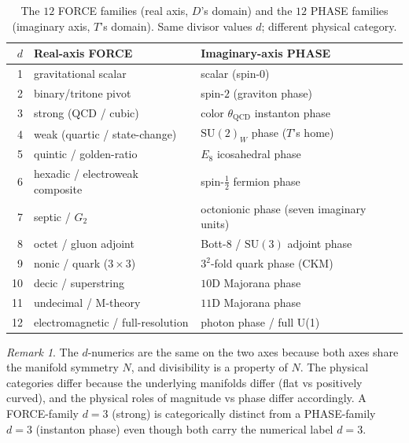 \documentclass[11pt,a4paper]{article}
\theoremstyle{definition}
\theoremstyle{remark}
\newtheorem{remark}[theorem]{Remark}
\begin{document}
\begin{table}[h]
\centering\small
\caption{The $12$ FORCE families (real axis, $D$'s domain) and the $12$ PHASE families (imaginary axis, $T$'s domain). Same divisor values $d$; different physical category.}
\label{tab:force-phase}
\begin{tabular}{@{}rll@{}}
\toprule
$d$ & Real-axis FORCE & Imaginary-axis PHASE \\
\midrule
 1 & gravitational scalar                       & scalar (spin-$0$) \\
 2 & binary/tritone pivot                        & spin-$2$ (graviton phase) \\
 3 & strong (QCD / cubic)                        & color $\theta_{\text{QCD}}$ instanton phase \\
 4 & weak (quartic / state-change)               & $\mathrm{SU}(2)_{W}$ phase ($T$'s home) \\
 5 & quintic / golden-ratio                      & $E_{8}$ icosahedral phase \\
 6 & hexadic / electroweak composite             & spin-$\tfrac{1}{2}$ fermion phase \\
 7 & septic / $G_{2}$                            & octonionic phase (seven imaginary units) \\
 8 & octet / gluon adjoint                       & Bott-$8$ / $\mathrm{SU}(3)$ adjoint phase \\
 9 & nonic / quark ($3\times 3$)                 & $3^{2}$-fold quark phase (CKM) \\
10 & decic / superstring                         & $10$D Majorana phase \\
11 & undecimal / M-theory                        & $11$D Majorana phase \\
12 & electromagnetic / full-resolution           & photon phase / full U(1) \\
\bottomrule
\end{tabular}
\end{table}

\begin{remark}
The $d$-numerics are the same on the two axes because both axes share the manifold symmetry $N$, and divisibility is a property of $N$. The physical categories differ because the underlying manifolds differ (flat vs positively curved), and the physical roles of magnitude vs phase differ accordingly. A FORCE-family $d=3$ (strong) is categorically distinct from a PHASE-family $d=3$ (instanton phase) even though both carry the numerical label $d=3$.
\end{remark}
\end{document}
